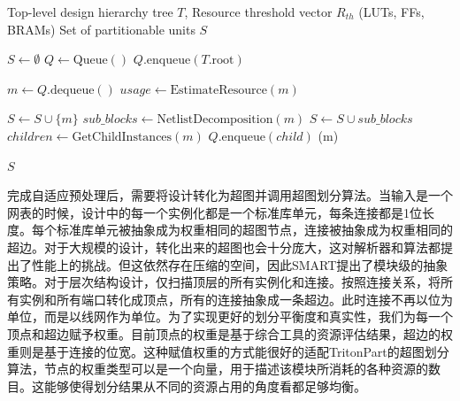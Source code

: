 \begin{algorithm}[hbt!]
    \caption{Resource-Aware Adaptive Granularity Partitioning}
    \label{alg:adaptive_partitioning}
    \begin{algorithmic}[1]
        \Require Top-level design hierarchy tree $T$, Resource threshold vector $R_{th}$ (LUTs, FFs, BRAMs)
        \Ensure Set of partitionable units $S$
        
        \State $S \gets \emptyset$
        \State $Q \gets \text{Queue}()$
        \State $Q.\text{enqueue}(T.\text{root})$ 
        
        \State $m \gets Q.\text{dequeue}()$
        \State $usage \gets \text{EstimateResource}(m)$ 
        
        \State $S \gets S \cup \{m\}$ 
        \Else
        \State {}
        \State $sub\_blocks \gets \text{NetlistDecomposition}(m)$
        \State $S \gets S \cup sub\_blocks$
        \Else
        \State {}
        \State $children \gets \text{GetChildInstances}(m)$
        \State $Q.\text{enqueue}(child)$
        \EndFor
        \State {}(m) 
        \EndIf
        \EndIf
        \EndWhile
        
        \Return $S$
    \end{algorithmic}
\end{algorithm}

完成自适应预处理后，需要将设计转化为超图并调用超图划分算法。当输入是一个网表的时候，设计中的每一个实例化都是一个标准库单元，每条连接都是1位长度。每个标准库单元被抽象成为权重相同的超图节点，连接被抽象成为权重相同的超边。对于大规模的设计，转化出来的超图也会十分庞大，这对解析器和算法都提出了性能上的挑战。但这依然存在压缩的空间，因此SMART提出了模块级的抽象策略。对于层次结构设计，仅扫描顶层的所有实例化和连接。按照连接关系，将所有实例和所有端口转化成顶点，所有的连接抽象成一条超边。此时连接不再以位为单位，而是以线网作为单位。为了实现更好的划分平衡度和真实性，我们为每一个顶点和超边赋予权重。目前顶点的权重是基于综合工具的资源评估结果，超边的权重则是基于连接的位宽。这种赋值权重的方式能很好的适配TritonPart的超图划分算法，节点的权重类型可以是一个向量，用于描述该模块所消耗的各种资源的数目。这能够使得划分结果从不同的资源占用的角度看都足够均衡。

